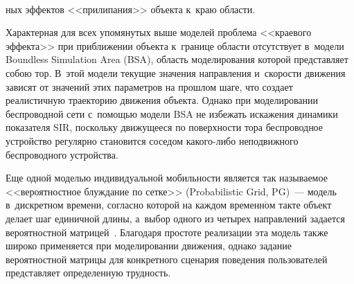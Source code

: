 \begin{multicols}{2}
\pagebreak

\end{multicols}

\begin{figure*} %
\vspace*{1pt}
 \begin{center}
 \mbox{%
 \epsfxsize=163.242mm 
 }
 \end{center}
\vspace*{-11pt}
\vspace*{-4pt}
\end{figure*}

\begin{multicols}{2} 

\noindent
ных
эффектов <<прилипания>> объекта к~краю об\-ласти. 

Характерная для всех 
упомянутых выше моделей проб\-ле\-ма <<краевого эффекта>> при 
приближении объекта к~границе об\-ласти отсутствует в~модели Boundless 
Simulation Area (BSA), об\-ласть моделирования которой пред\-став\-ля\-ет собою 
тор. В~этой модели текущие значения на\-прав\-ле\-ния и~ско\-рости движения 
зависят от значений этих па\-ра\-мет\-ров на прошлом шаге, что создает 
реалистичную траекторию движения объекта. Однако при моделировании 
беспроводной сети с~по\-мощью модели BSA не избежать искажения 
динамики показателя SIR, поскольку движущееся по по\-верх\-ности тора 
беспроводное устройство регулярно становится соседом ка\-ко\-го-ли\-бо 
неподвижного беспроводного устройства. 

Еще одной моделью 
индивидуальной мо\-биль\-ности является так на\-зы\-ва\-емое <<вероятностное 
блуж\-да\-ние по сетке>> (Probabilistic Grid, PG)~--- модель в~дискретном 
времени, со\-глас\-но которой на каждом временн$\acute{\mbox{о}}$м такте объект делает шаг 
единичной длины, а~выбор одного из четырех на\-прав\-ле\-ний задается 
вероятностной мат\-ри\-цей~\cite{10-sg}. Благодаря простоте реализации эта 
модель так\-же широко применяется при моделировании движения, однако 
задание вероятностной мат\-ри\-цы для конкретного сценария поведения 
пользователей пред\-став\-ля\-ет определенную труд\-ность.
  

\end{multicols}
